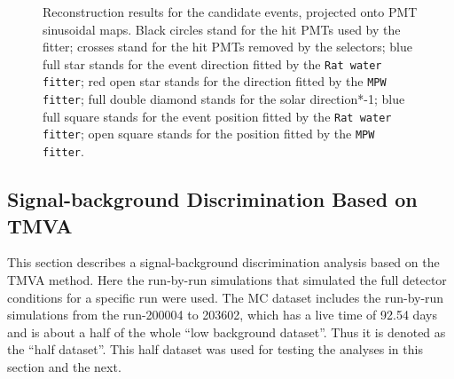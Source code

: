\begin{figure}[htbp]
{\begin{minipage}[t]{0.4\textwidth}
		\end{minipage}
	}
	\caption[Reconstruction results for the candidate events, projected onto PMT sinusoidal maps.]{Reconstruction results for the candidate events, projected onto PMT sinusoidal maps. Black circles stand for
		the hit PMTs used by the fitter; crosses stand for the hit PMTs removed by the selectors; blue full star stands for the event direction fitted by the \texttt{Rat water fitter}; red open star stands for the direction fitted by the \texttt{MPW fitter}; full double diamond stands for the solar direction*-1; blue full square stands for the event position fitted by the \texttt{Rat water fitter}; open square stands for the position fitted by the \texttt{MPW fitter}.}
	\label{openDataSetCandidate}
\end{figure}


\subsection{Signal-background Discrimination Based on TMVA}\label{sect:tmva}
This section describes a signal-background discrimination analysis based on the TMVA method. Here the run-by-run simulations that simulated the full detector conditions for a specific run were used. The MC dataset includes the run-by-run simulations from the run-200004 to 203602, which has a live time of 92.54 days and is about a half of the whole ``low background dataset''. Thus it is denoted as the ``half dataset''. This half dataset was used for testing the analyses in this section and the next.

